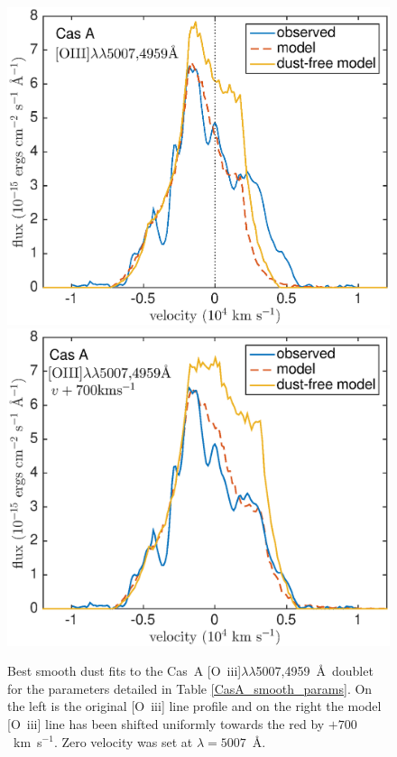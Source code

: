 {\begin{landscape}
\begin{table}
\end{table}
\end{landscape}
\begin{figure}
\centering
\includegraphics[scale=0.43,clip=true, trim=30 0 50 20]{chapters/chapter6/figs/CasA/CasA_OIII}
\includegraphics[scale=0.43,clip=true, trim=30 0 50 20]{chapters/chapter6/figs/CasA/CasA_shifted_OIII}
\caption{Best smooth dust fits to the Cas~A [O~{\sc iii}]$\lambda\lambda$5007,4959~\AA\ doublet for the parameters detailed in Table \ref{CasA_smooth_params}.  On the left is the original [O~{\sc iii}] line profile and on the right the model [O~{\sc iii}] line has been shifted uniformly towards the red by $+700$~km~s$^{-1}$. Zero velocity was set at $\lambda=5007$~\AA.}
\label{CasA_OIII}
\end{figure}
}


